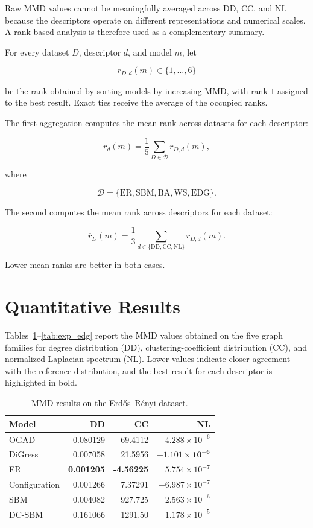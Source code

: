 Raw MMD values cannot be meaningfully averaged across DD, CC, and NL because the descriptors operate on different representations and numerical scales. A rank-based analysis is therefore used as a complementary summary.

For every dataset \(D\), descriptor \(d\), and model \(m\), let

\[
r_{D,d}(m)\in\{1,\ldots,6\}
\]

be the rank obtained by sorting models by increasing MMD, with rank \(1\) assigned to the best result. Exact ties receive the average of the occupied ranks.

The first aggregation computes the mean rank across datasets for each descriptor:

\[
\overline{r}_{d}(m)
=
\frac{1}{5}
\sum_{D\in\mathcal{D}}
r_{D,d}(m),
\]

where

\[
\mathcal{D}
=
\{
\mathrm{ER},
\mathrm{SBM},
\mathrm{BA},
\mathrm{WS},
\mathrm{EDG}
\}.
\]

The second computes the mean rank across descriptors for each dataset:

\[
\overline{r}_{D}(m)
=
\frac{1}{3}
\sum_{d\in\{\mathrm{DD},\mathrm{CC},\mathrm{NL}\}}
r_{D,d}(m).
\]

Lower mean ranks are better in both cases.

\section{Quantitative Results}
\label{sec:exp_results}

Tables~\ref{tab:exp_er}--\ref{tab:exp_edg} report the MMD values obtained on the five graph families for degree distribution (DD), clustering-coefficient distribution (CC), and normalized-Laplacian spectrum (NL).
Lower values indicate closer agreement with the reference distribution, and the best result for each descriptor is highlighted in bold.

\begin{table}[H]
    \centering
    \caption{MMD results on the Erd\H{o}s--R\'enyi dataset.}
    \label{tab:exp_er}
    \begin{tabular}{lrrr}
        \hline
        Model & DD & CC & NL \\
        \hline
        OGAD          & 0.080129 & 69.4112   & \(4.288\times10^{-6}\) \\
        DiGress       & 0.007058 & 21.5956   & \(\mathbf{-1.101\times10^{-6}}\) \\
        ER            & \textbf{0.001205} & \textbf{-4.56225} & \(5.754\times10^{-7}\) \\
        Configuration & 0.001266 & 7.37291   & \(-6.987\times10^{-7}\) \\
        SBM           & 0.004082 & 927.725   & \(2.563\times10^{-6}\) \\
        DC-SBM        & 0.161066 & 1291.50   & \(1.178\times10^{-5}\) \\
        \hline
    \end{tabular}
\end{table}

